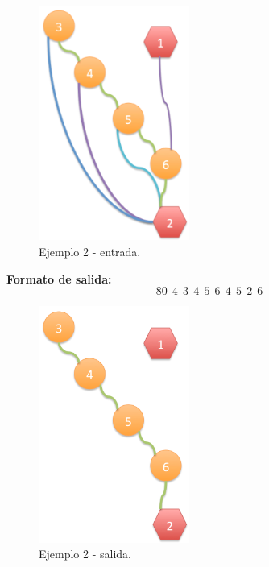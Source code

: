 \begin{itemize}
\begin{figure}[H] %
\begin{center}
\includegraphics[width=140pt]{../imgs/ejemplo2ej3ent.jpg}
\end{center}
  \hfill
\caption{Ejemplo 2 - entrada.}
\end{figure}

\textbf{Formato de salida:}
$$80\ \ 4\ \ 3\ \ 4\ \ 5\ \ 6\ \ 4\ \ 5\ \ 2\ \ 6$$

\begin{figure}[H] %
\begin{center}
\includegraphics[width=140pt]{../imgs/ejemplo2ej3sal.jpg}
\caption{Ejemplo 2 - salida.}
\end{center}
\end{figure}
\end{itemize}


